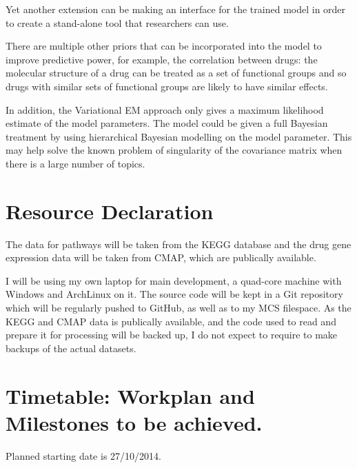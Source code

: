 \documentclass[12pt,a4]{article}
\begin{document}
Yet another extension can be making an interface for the trained model in order to create a stand-alone tool that researchers can use.

There are multiple other priors that can be incorporated into the model to improve predictive power, for example, the correlation between drugs: the molecular structure of a drug can be treated as a set of functional groups and so drugs with similar sets of functional groups are likely to have similar effects.

In addition, the Variational EM approach only gives a maximum likelihood estimate of the model parameters. The model could be given a full Bayesian treatment by using hierarchical Bayesian modelling on the model parameter. This may help solve the known problem of singularity of the covariance matrix when there is a large number of topics\cite{Masada:2013:RIC:2525761.2525819}.

\section*{Resource Declaration}

The data for pathways will be taken from the KEGG\cite{KEGG} database and the drug gene expression data will be taken from CMAP\cite{CMap}, which are publically available.

I will be using my own laptop for main development, a quad-core machine with Windows and ArchLinux on it. The source code will be kept in a Git repository which will be regularly pushed to GitHub, as well as to my MCS filespace. As the KEGG and CMAP data is publically available, and the code used to read and prepare it for processing will be backed up, I do not expect to require to make backups of the actual datasets.

\section*{Timetable: Workplan and Milestones to be achieved.}

Planned starting date is 27/10/2014.
\end{document}
